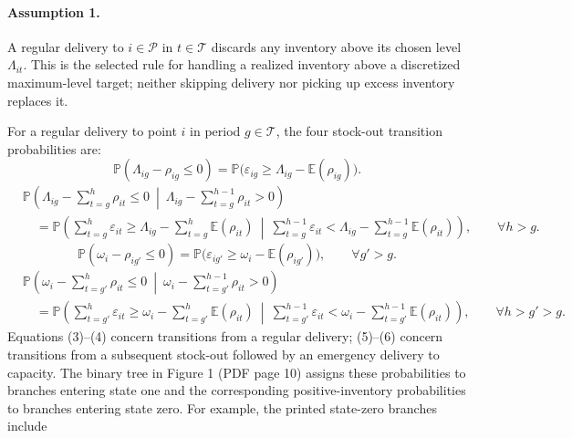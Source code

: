 \documentclass[10pt]{article}
\begin{document}
\paragraph{Assumption 1.}
A regular delivery to $i\in\mathcal P$ in $t\in\mathcal T$ discards any inventory above its chosen level $\Lambda_{it}$. This is the selected rule for handling a realized inventory above a discretized maximum-level target; neither skipping delivery nor picking up excess inventory replaces it.

For a regular delivery to point $i$ in period $g\in\mathcal T$, the four stock-out transition probabilities are:
\begin{equation}
\mathbb P(\Lambda_{ig}-\rho_{ig}\leqslant0)
=\mathbb P\bigl(\varepsilon_{ig}\geqslant\Lambda_{ig}-\mathbb E(\rho_{ig})\bigr).
\tag{3}
\end{equation}
\begin{equation}
\begin{aligned}
&\mathbb P\left(\Lambda_{ig}-\sum_{t=g}^{h}\rho_{it}\leqslant0\ \middle|\ \Lambda_{ig}-\sum_{t=g}^{h-1}\rho_{it}>0\right)\\
&\quad=\mathbb P\left(\sum_{t=g}^{h}\varepsilon_{it}\geqslant\Lambda_{ig}-\sum_{t=g}^{h}\mathbb E(\rho_{it})\ \middle|\ \sum_{t=g}^{h-1}\varepsilon_{it}<\Lambda_{ig}-\sum_{t=g}^{h-1}\mathbb E(\rho_{it})\right),\qquad\forall h>g.
\end{aligned}\tag{4}
\end{equation}
\begin{equation}
\mathbb P(\omega_i-\rho_{ig'}\leqslant0)
=\mathbb P\bigl(\varepsilon_{ig'}\geqslant\omega_i-\mathbb E(\rho_{ig'})\bigr),\qquad\forall g'>g.
\tag{5}
\end{equation}
\begin{equation}
\begin{aligned}
&\mathbb P\left(\omega_i-\sum_{t=g'}^{h}\rho_{it}\leqslant0\ \middle|\ \omega_i-\sum_{t=g'}^{h-1}\rho_{it}>0\right)\\
&\quad=\mathbb P\left(\sum_{t=g'}^{h}\varepsilon_{it}\geqslant\omega_i-\sum_{t=g'}^{h}\mathbb E(\rho_{it})\ \middle|\ \sum_{t=g'}^{h-1}\varepsilon_{it}<\omega_i-\sum_{t=g'}^{h-1}\mathbb E(\rho_{it})\right),\qquad\forall h>g'>g.
\end{aligned}\tag{6}
\end{equation}
Equations (3)--(4) concern transitions from a regular delivery; (5)--(6) concern transitions from a subsequent stock-out followed by an emergency delivery to capacity. The binary tree in Figure 1 (PDF page 10) assigns these probabilities to branches entering state one and the corresponding positive-inventory probabilities to branches entering state zero. For example, the printed state-zero branches include
\end{document}
